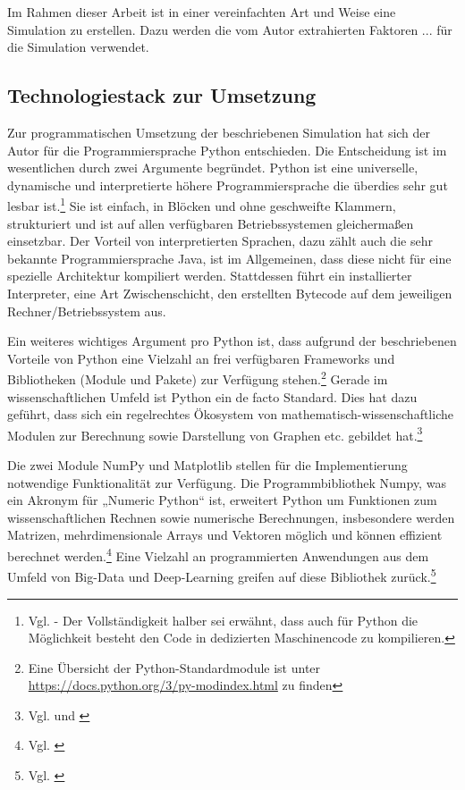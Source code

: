 \documentclass[12pt]{article}
\begin{document}
Im Rahmen dieser Arbeit ist in einer vereinfachten Art und Weise eine Simulation zu erstellen. Dazu werden die vom Autor extrahierten Faktoren ... für die Simulation verwendet.

\subsection{Technologiestack zur Umsetzung}
Zur programmatischen Umsetzung der beschriebenen Simulation hat sich der Autor für die Programmiersprache Python entschieden. Die Entscheidung ist im wesentlichen durch zwei Argumente begründet. Python ist eine universelle, dynamische und interpretierte höhere Programmiersprache die überdies sehr gut lesbar ist.\footnote{Vgl. \cite{PythonGoodFor} - Der Vollständigkeit halber sei erwähnt, dass auch für Python die Möglichkeit besteht den Code in dedizierten Maschinencode zu kompilieren.} Sie ist einfach, in Blöcken und ohne geschweifte Klammern, strukturiert und ist auf allen verfügbaren Betriebssystemen gleichermaßen einsetzbar. Der Vorteil von interpretierten Sprachen, dazu zählt auch die sehr bekannte Programmiersprache Java, ist im Allgemeinen, dass diese nicht für eine spezielle Architektur kompiliert werden. Stattdessen führt ein installierter Interpreter, eine Art Zwischenschicht, den erstellten Bytecode auf dem jeweiligen Rechner/Betriebssystem aus.

Ein weiteres wichtiges Argument pro Python ist, dass aufgrund der beschriebenen Vorteile von Python eine Vielzahl an frei verfügbaren Frameworks und Bibliotheken (Module und Pakete) zur Verfügung stehen.\footnote{Eine Übersicht der Python-Standardmodule ist unter \url{https://docs.python.org/3/py-modindex.html} zu finden} Gerade im wissenschaftlichen Umfeld ist Python ein de facto Standard. Dies hat dazu geführt, dass sich ein regelrechtes Ökosystem von mathematisch-wissenschaftliche Modulen zur Berechnung sowie Darstellung von Graphen etc. gebildet hat.\footnote{Vgl. \cite{scipy} und \cite{dataquest}} 

Die zwei Module NumPy und Matplotlib stellen für die Implementierung notwendige Funktionalität zur Verfügung. Die Programmbibliothek Numpy, was ein Akronym für „Numeric Python“ ist, erweitert Python um Funktionen zum wissenschaftlichen Rechnen sowie numerische Berechnungen, insbesondere werden Matrizen, mehrdimensionale Arrays und Vektoren möglich und können effizient berechnet werden.\footnote{Vgl. \cite{numpy}} Eine Vielzahl an programmierten Anwendungen aus dem Umfeld von Big-Data und Deep-Learning greifen auf diese Bibliothek zurück.\footnote{Vgl. \cite{bigdata}}
\end{document}
